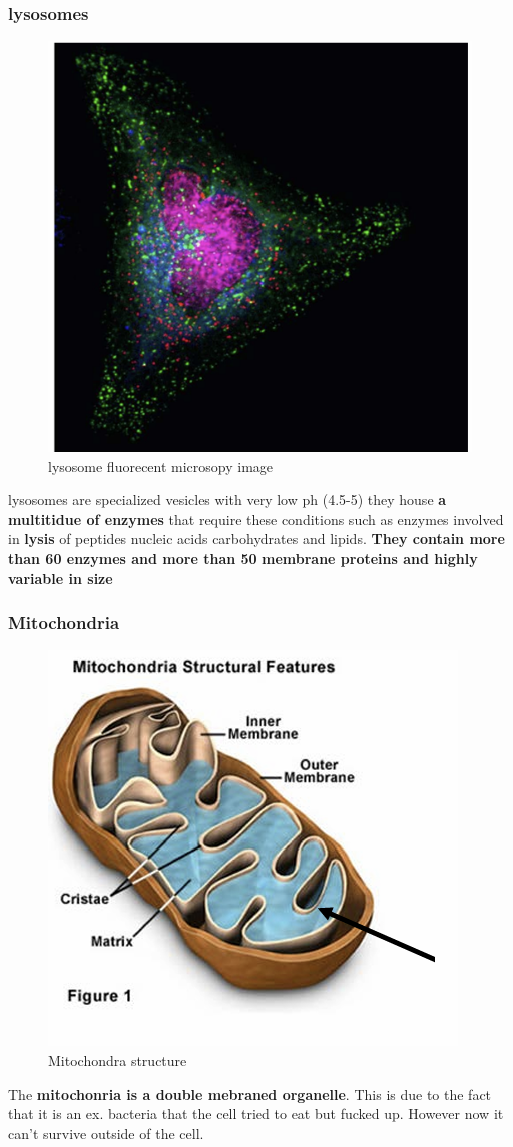 \documentclass[../main.tex]{subfiles}
\begin{document}
\subsubsection{lysosomes}
\begin{figure}[H]
    \centering
    \includegraphics[width=0.3\linewidth]{lysosome.png}
    \caption{lysosome fluorecent microsopy image}
    \label{fig:enter-label}
\end{figure}
lysosomes are specialized vesicles with very low ph (4.5-5) they house \textbf{a multitidue of enzymes} that require these conditions such as enzymes involved in\textbf{ lysis} of peptides nucleic acids carbohydrates and lipids. \textbf{They contain more than 60 enzymes and more than 50 membrane proteins and highly variable in size}


\subsubsection{Mitochondria}
\begin{figure}[H]
    \centering
    \includegraphics[width=0.5\linewidth]{mitochondria.png}
    \caption{Mitochondra structure}
    \label{fig:enter-label}
\end{figure}
The \textbf{mitochonria is a double mebraned organelle}. This is due to the fact that it is an ex. bacteria that the cell tried to eat but fucked up. However now it can't survive outside of the cell. 
\end{document}
